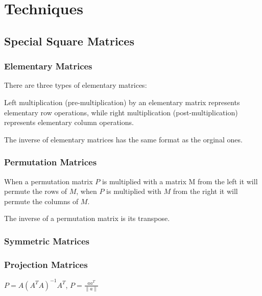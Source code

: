 
\part{Techniques}
\chapter{Special Square Matrices}
\section{Elementary Matrices}
There are three types of elementary matrices: {\color{red}{Row Switching, Row Multiplication, and Row Addition.}}

\begin{rmk}
	Left multiplication (pre-multiplication) by an elementary matrix represents elementary row operations, while right multiplication (post-multiplication) represents elementary column operations.
\end{rmk}

\begin{rmk}
	The inverse of elementary matrices has the same format as the orginal ones.
\end{rmk}

\section{Permutation  Matrices}
\begin{rmk}
	When a permutation matrix $P$ is multiplied with a matrix M from the left it will permute the rows of $M$, when $P$ is multiplied with $M$ from the right it will permute the columns of $M$.
\end{rmk}

\begin{rmk}
	The inverse of a permutation matrix is its transpose.
\end{rmk}

\section{Symmetric Matrices}

\section{Projection Matrices}
\begin{rmk}
	$P = A(A^TA)^{-1}A^T$, $P = \frac{aa^T}{\|a\|}$
\end{rmk}

